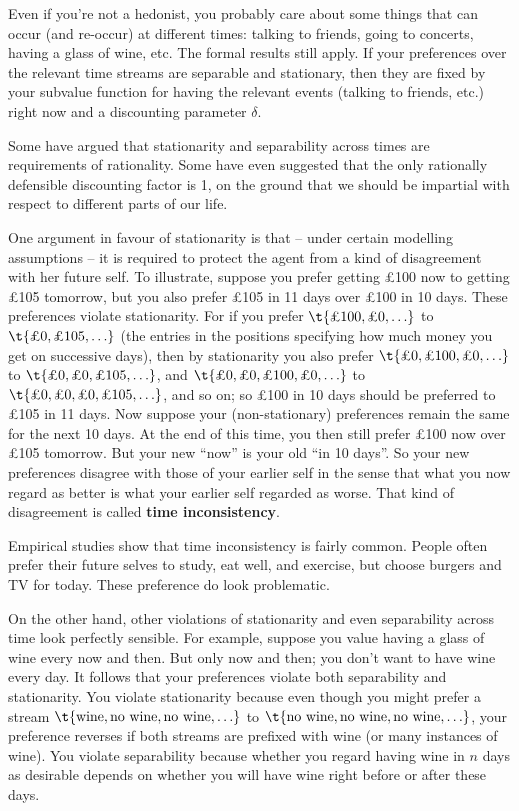 Even if you're not a hedonist, you probably care about some things
that can occur (and re-occur) at different times: talking to friends,
going to concerts, having a glass of wine, etc. The formal results
still apply. If your preferences over the relevant time streams are
separable and stationary, then they are fixed by your subvalue
function for having the relevant events (talking to friends, etc.)
right now and a discounting parameter $\delta$.

Some have argued that stationarity and separability across times are
requirements of rationality. Some have even suggested that the only
rationally defensible discounting factor is 1, on the ground that we
should be impartial with respect to different parts of our life.

One argument in favour of stationarity is that -- under certain
modelling assumptions -- it is required to protect the agent from a
kind of disagreement with her future self. To illustrate, suppose you
prefer getting £100 now to getting £105 tomorrow, but you also prefer
£105 in 11 days over £100 in 10 days. These preferences violate
stationarity. For if you prefer $\t{\text{£100}, \text{£0}, \ldots}$
to $\t{\text{£0}, \text{£105}, \ldots}$ (the entries in the positions
specifying how much money you get on successive days), then by
stationarity you also prefer $\t{\text{£0}, \text{£100}, \text{£0},
  \ldots}$ to $\t{\text{£0}, \text{£0}, \text{£105}, \ldots}$, and
$\t{\text{£0}, \text{£0}, \text{£100}, \text{£0}, \ldots}$ to
$\t{\text{£0}, \text{£0}, \text{£0}, \text{£105}, \ldots}$, and so on;
so £100 in 10 days should be preferred to £105 in 11 days. Now suppose
your (non-stationary) preferences remain the same for the next 10
days. At the end of this time, you then still prefer £100 now over
£105 tomorrow. But your new ``now'' is your old ``in 10 days''. So
your new preferences disagree with those of your earlier self in the
sense that what you now regard as better is what your earlier self
regarded as worse. That kind of disagreement is called \textbf{time
  inconsistency}.

Empirical studies show that time inconsistency is fairly common. People often
prefer their future selves to study, eat well, and exercise, but choose burgers
and TV for today. These preference do look problematic.

On the other hand, other violations of stationarity and even separability across
time look perfectly sensible. For example, suppose you value having a glass of
wine every now and then. But only now and then; you don't want to have wine
every day. It follows that your preferences violate both separability and
stationarity. You violate stationarity because even though you might prefer a
stream $\t{\text{wine}, \text{no wine}, \text{no wine}, \ldots}$ to $\t{\text{no
    wine}, \text{no wine}, \text{no wine}, \ldots}$, your preference reverses if
both streams are prefixed with wine (or many instances of wine). You violate
separability because whether you regard having wine in $n$ days as desirable
depends on whether you will have wine right before or after these days.

